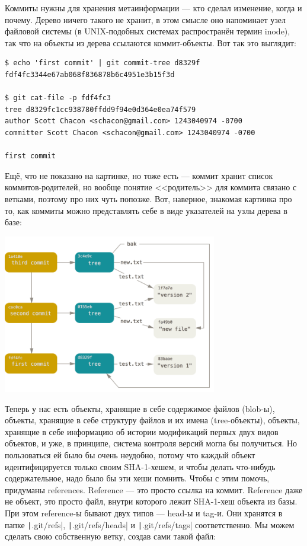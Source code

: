 \documentclass[a5paper]{article}
\begin{document}
Коммиты нужны для хранения метаинформации --- кто сделал изменение, когда и почему. Дерево ничего такого не хранит, в этом смысле оно напоминает узел файловой системы (в UNIX-подобных системах распространён термин inode), так что на объекты из дерева ссылаются коммит-объекты. Вот так это выглядит:
\begin{verbatim}
$ echo 'first commit' | git commit-tree d8329f
fdf4fc3344e67ab068f836878b6c4951e3b15f3d

$ git cat-file -p fdf4fc3
tree d8329fc1cc938780ffdd9f94e0d364e0ea74f579
author Scott Chacon <schacon@gmail.com> 1243040974 -0700
committer Scott Chacon <schacon@gmail.com> 1243040974 -0700

first commit
\end{verbatim}

Ещё, что не показано на картинке, но тоже есть --- коммит хранит список коммитов-родителей, но вообще понятие <<родитель>> для коммита связано с ветками, поэтому про них чуть попозже. Вот, наверное, знакомая картинка про то, как коммиты можно представлять себе в виде указателей на узлы дерева в базе:

\begin{center}
    \includegraphics[width=0.7\textwidth]{gitCommitObjects.png}
\end{center}

Теперь у нас есть объекты, хранящие в себе содержимое файлов (blob-ы), объекты, хранящие в себе структуру файлов и их имена (tree-объекты), объекты, хранящие в себе информацию об истории модификаций первых двух видов объектов, и уже, в принципе, система контроля версий могла бы получиться. Но пользоваться ей было бы очень неудобно, потому что каждый объект идентифицируется только своим SHA-1-хешем, и чтобы делать что-нибудь содержательное, надо было бы эти хеши помнить. Чтобы с этим помочь, придуманы references. Reference --- это просто ссылка на коммит. Reference даже не объект, это просто файл, внутри которого лежит SHA-1-хеш объекта из базы. При этом reference-ы бывают двух типов --- head-ы и tag-и. Они хранятся в папке \texttt|.git/refs|, \texttt|.git/refs/heads| и \texttt|.git/refs/tags| соответственно. Мы можем сделать свою собственную ветку, создав сами такой файл:
\end{document}
